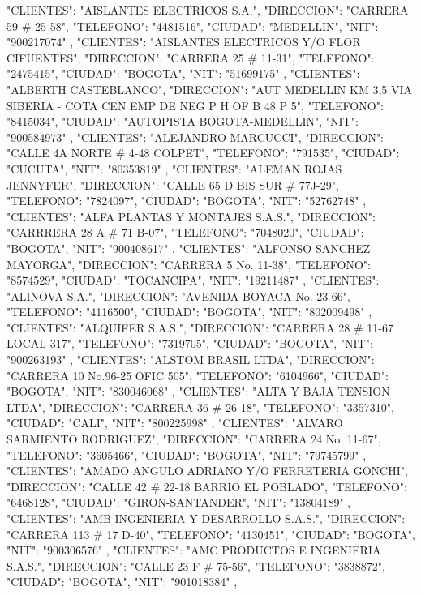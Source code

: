    {
   "CLIENTES": "AISLANTES ELECTRICOS S.A.",
   "DIRECCION": "CARRERA 59 # 25-58",
   "TELEFONO": "4481516",
   "CIUDAD": "MEDELLIN",
   "NIT": "900217074"
   },
   {
   "CLIENTES": "AISLANTES ELECTRICOS Y/O FLOR CIFUENTES",
   "DIRECCION": "CARRERA 25 # 11-31",
   "TELEFONO": "2475415",
   "CIUDAD": "BOGOTA",
   "NIT": "51699175"
   },
   {
   "CLIENTES": "ALBERTH CASTEBLANCO",
   "DIRECCION": "AUT MEDELLIN KM 3,5 VIA SIBERIA - COTA CEN EMP DE NEG P H OF B 48 P 5",
   "TELEFONO": "8415034",
   "CIUDAD": "AUTOPISTA BOGOTA-MEDELLIN",
   "NIT": "900584973"
   },
   {
   "CLIENTES": "ALEJANDRO MARCUCCI",
   "DIRECCION": "CALLE 4A NORTE # 4-48 COLPET",
   "TELEFONO": "791535",
   "CIUDAD": "CUCUTA",
   "NIT": "80353819"
   },
   {
   "CLIENTES": "ALEMAN ROJAS JENNYFER",
   "DIRECCION": "CALLE 65 D BIS SUR # 77J-29",
   "TELEFONO": "7824097",
   "CIUDAD": "BOGOTA",
   "NIT": "52762748"
   },
   {
   "CLIENTES": "ALFA PLANTAS Y MONTAJES S.A.S.",
   "DIRECCION": "CARRRERA 28 A # 71 B-07",
   "TELEFONO": "7048020",
   "CIUDAD": "BOGOTA",
   "NIT": "900408617"
   },
   {
   "CLIENTES": "ALFONSO SANCHEZ MAYORGA",
   "DIRECCION": "CARRERA 5 No. 11-38",
   "TELEFONO": "8574529",
   "CIUDAD": "TOCANCIPA",
   "NIT": "19211487"
   },
   {
   "CLIENTES": "ALINOVA S.A.",
   "DIRECCION": "AVENIDA BOYACA No. 23-66",
   "TELEFONO": "4116500",
   "CIUDAD": "BOGOTA",
   "NIT": "802009498"
   },
   {
   "CLIENTES": "ALQUIFER S.A.S.",
   "DIRECCION": "CARRERA 28 # 11-67 LOCAL 317",
   "TELEFONO": "7319705",
   "CIUDAD": "BOGOTA",
   "NIT": "900263193"
   },
   {
   "CLIENTES": "ALSTOM BRASIL LTDA",
   "DIRECCION": "CARRERA 10 No.96-25 OFIC 505",
   "TELEFONO": "6104966",
   "CIUDAD": "BOGOTA",
   "NIT": "830046068"
   },
   {
   "CLIENTES": "ALTA Y BAJA TENSION LTDA",
   "DIRECCION": "CARRERA 36 # 26-18",
   "TELEFONO": "3357310",
   "CIUDAD": "CALI",
   "NIT": "800225998"
   },
   {
   "CLIENTES": "ALVARO SARMIENTO RODRIGUEZ",
   "DIRECCION": "CARRERA 24 No. 11-67",
   "TELEFONO": "3605466",
   "CIUDAD": "BOGOTA",
   "NIT": "79745799"
   },
   {
   "CLIENTES": "AMADO ANGULO ADRIANO Y/O FERRETERIA GONCHI",
   "DIRECCION": "CALLE 42 # 22-18 BARRIO EL POBLADO",
   "TELEFONO": "6468128",
   "CIUDAD": "GIRON-SANTANDER",
   "NIT": "13804189"
   },
   {
   "CLIENTES": "AMB INGENIERIA Y DESARROLLO S.A.S.",
   "DIRECCION": "CARRERA 113 # 17 D-40",
   "TELEFONO": "4130451",
   "CIUDAD": "BOGOTA",
   "NIT": "900306576"
   },
   {
   "CLIENTES": "AMC PRODUCTOS E INGENIERIA S.A.S.",
   "DIRECCION": "CALLE 23 F # 75-56",
   "TELEFONO": "3838872",
   "CIUDAD": "BOGOTA",
   "NIT": "901018384"
   },
